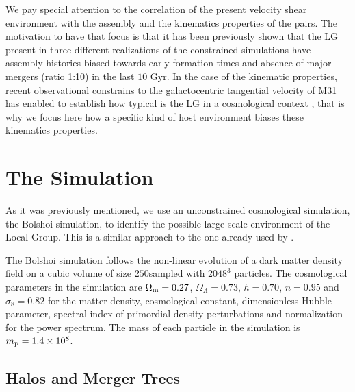 \documentclass[usenatbib]{latex/mn2e}
\begin{document}
We pay special attention to the correlation of the present velocity shear 
environment with the assembly and the kinematics properties of the pairs. 
The motivation to have that focus is that it has been previously shown 
that the LG present in three different realizations of the constrained 
simulations have assembly histories biased towards early formation times 
and absence of major mergers (ratio 1:10) in the last $10$ Gyr. In the 
case of the kinematic properties, recent observational constrains to the 
galactocentric tangential velocity of M31 has enabled to establish how 
typical is the LG in a cosmological context , that is why we focus here how a specific kind 
of host environment biases these kinematics properties.



\section{The Simulation}
\label{sec:the_simulation}


As it was previously mentioned, we use an unconstrained cosmological 
simulation, the Bolshoi simulation, to identify the possible large scale 
environment of the Local Group. This is a similar approach to the one already 
used by .



The Bolshoi simulation follows the non-linear evolution of a dark matter 
density field on a cubic volume of size $250$\hMpc sampled with $2048^3$ 
particles. The cosmological parameters in the simulation are 
$\Omega_{\rm m}=0.27$, $\Omega_{\Lambda}=0.73$, $h=0.70$, $n=0.95$ and 
$\sigma_{8}=0.82$ for the matter density, cosmological constant, 
dimensionless Hubble parameter, spectral index of primordial density 
perturbations and normalization for the power spectrum. The mass of each 
particle in the simulation is $m_{\rm p}=1.4\times 10^{8}$\hMsun.



\subsection{Halos and Merger Trees}
\label{subsec:halos_merger_trees}
\end{document}
